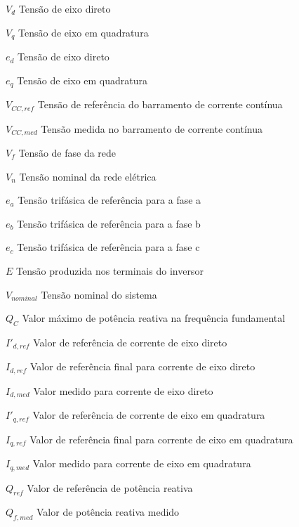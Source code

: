 \begin{simbolos}
  \item[$ V_d $] Tensão de eixo direto
  \item[$ V_q $] Tensão de eixo em quadratura
  \item[$ e_d $] Tensão de eixo direto
  \item[$ e_q $] Tensão de eixo em quadratura
  \item[$ V_{CC,ref} $] Tensão de referência do barramento de corrente contínua
  \item[$ V_{CC,med} $] Tensão medida no barramento de corrente contínua
  \item[$ V_f $] Tensão de fase da rede
  \item[$ V_n $] Tensão nominal da rede elétrica
  \item[$ e_a $] Tensão trifásica de referência para a fase a
  \item[$ e_b $] Tensão trifásica de referência para a fase b
  \item[$ e_c $] Tensão trifásica de referência para a fase c 
  \item[$ E $] Tensão produzida nos terminais do inversor
  \item[$ V_{nominal} $] Tensão nominal do sistema
  \item[$ Q_C $] Valor máximo de potência reativa na frequência fundamental
  \item[$ I'_{d,ref} $] Valor de referência de corrente de eixo direto
  \item[$ I_{d,ref} $] Valor de referência final para corrente de eixo direto
  \item[$ I_{d,med} $] Valor medido para corrente de eixo direto
  \item[$ I'_{q,ref} $] Valor de referência de corrente de eixo em quadratura
  \item[$ I_{q,ref} $] Valor de referência final para corrente de eixo em quadratura
  \item[$ I_{q,med} $] Valor medido para corrente de eixo em quadratura
  \item[$ Q_{ref} $] Valor de referência de potência reativa
  \item[$ Q_{f,med} $] Valor de potência reativa medido
\end{simbolos}
